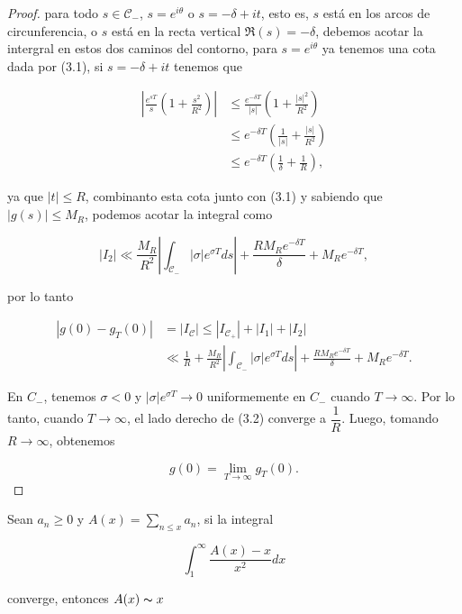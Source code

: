 \begin{proof}
para todo $s \in \mathscr{C}_-$, $s=e^{i\theta}$ o $s=-\delta+it$, esto es, $s$ está en los arcos de circunferencia, o $s$ está en la recta vertical $\Re(s)=-\delta$, debemos acotar la intergral en estos dos caminos del contorno, para $s=e^{i\theta}$ ya tenemos una cota dada por (3.1), si $s=-\delta+it$ tenemos que

\begin{align*}
    \left|\frac{e^{s T}}{s}\left(1+\frac{s^2}{R^2}\right)\right|&\leq \frac{e^{-\delta T}}{|s|}\left(1+\frac{|s|^2}{R^2}\right)\\
    &\leq e^{-\delta T}\left(\frac{1}{|s|}+\frac{|s|}{R^2}\right)\\
    &\leq e^{-\delta T}\left(\frac{1}{\delta}+\frac{1}{R}\right)
,\end{align*}

ya que $|t|\leq R$, combinanto esta cota junto con (3.1) y sabiendo que $|g(s)|\leq M_R$, podemos acotar la integral como

$$|I_2|\ll \frac{M_R}{R^2}\left|\int_{\mathscr{C}_-} |\sigma|e^{\sigma T} d s\right|+\frac{R M_R e^{-\delta T}}{\delta}+M_R e^{-\delta T},$$


por lo tanto

\begin{equation}
    \begin{aligned}
    |g(0)-g_T(0)|&=|I_{\mathscr{C}}|\leq |I_{\mathscr{C}_+}|+|I_1|+|I_2|\\
    &\ll \frac{1}{R}+\frac{M_R}{R^2}\left|\int_{\mathscr{C}_-} |\sigma|e^{\sigma T} d s\right|+\frac{R M_R e^{-\delta T}}{\delta}+M_R e^{-\delta T}
.\end{aligned}
\end{equation}

En \( C_{-} \), tenemos \( \sigma < 0 \) y \( |\sigma| e^{\sigma T} \rightarrow 0 \) uniformemente en \( C_{-} \) cuando \( T \rightarrow \infty \). Por lo tanto, cuando \( T \rightarrow \infty \), el lado derecho de (3.2) converge a \( \dfrac{1}{R} \). Luego, tomando \( R \rightarrow \infty \), obtenemos 

\[
g(0) = \lim _{T \rightarrow \infty} g_T(0).
\]
\end{proof}

\begin{lemma}

Sean $a_n\geq 0$ y $A(x)=\displaystyle\sum_{n\leq x} a_n$, si  la integral

$$\int_1^{\infty}\frac{A(x)-x}{x^2}dx$$

converge, entonces $A(x)\thicksim x$

\end{lemma}

